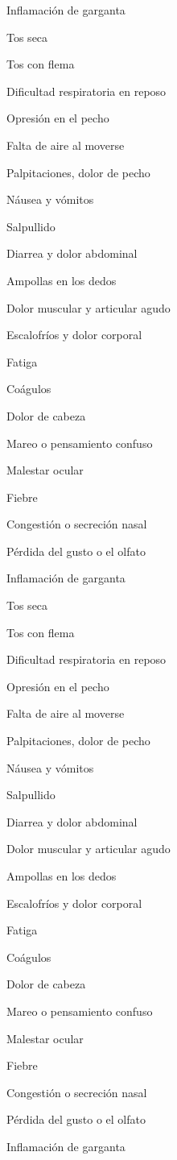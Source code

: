 Inflamación de garganta

Tos seca

Tos con flema

Dificultad respiratoria en reposo

Opresión en el pecho

Falta de aire al moverse

Palpitaciones, dolor de pecho

Náusea y vómitos

Salpullido

Diarrea y dolor abdominal

Ampollas en los dedos

Dolor muscular y articular agudo

Escalofríos y dolor corporal

Fatiga

Coágulos

Dolor de cabeza

Mareo o pensamiento confuso

Malestar ocular

Fiebre

Congestión o secreción nasal

Pérdida del gusto o el olfato

Inflamación de garganta

Tos seca

Tos con flema

Dificultad respiratoria en reposo

Opresión en el pecho

Falta de aire al moverse

Palpitaciones, dolor de pecho

Náusea y vómitos

Salpullido

Diarrea y dolor abdominal

Dolor muscular y articular agudo

Ampollas en los dedos

Escalofríos y dolor corporal

Fatiga

Coágulos

Dolor de cabeza

Mareo o pensamiento confuso

Malestar ocular

Fiebre

Congestión o secreción nasal

Pérdida del gusto o el olfato

Inflamación de garganta

